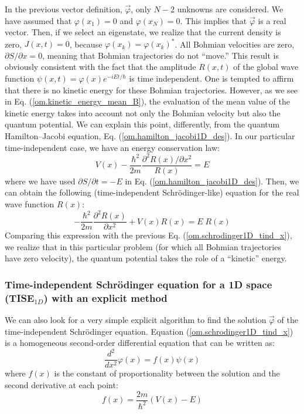 \documentclass[nofootinbib, secnumarabic, amsmath, nobibnotes,11pt,aps,pra, floatfix]{revtex4-1}
\newcommand{\eref}[1]{Eq. (\ref{#1})}
\newcommand{\Eref}[1]{Equation (\ref{#1})}
\begin{document}
In the previous vector definition, $\vec \varphi$, only $N - 2$ unknowns are considered. We have assumed that $\varphi(x_1) = 0$ and $\varphi(x_N) = 0$. This implies that $\vec \varphi$ is a real vector. Then, if we select an eigenstate,  we realize that the current density is zero, $J(x,t) = 0$, because $\varphi(x_k) = \varphi(x_k)^*$. All Bohmian velocities are zero, $\partial S/\partial x = 0$, meaning that Bohmian trajectories do not ``move.'' This result is obviously consistent with the fact that the amplitude $R(x,t)$ of the global wave function $\psi(x,t) = \varphi(x) e^{-iE t/\hbar}$ is time independent. One is tempted to affirm that there is no kinetic energy for these Bohmian trajectories. However, as we see in \eref{om.kinetic_energy_mean_B}, the evaluation of the mean value of the kinetic energy takes into account not only the Bohmian velocity but also the quantum potential. We can explain this point, differently, from the quantum Hamilton--Jacobi equation, \eref{om.hamilton_jacobi1D_des}. In our particular time-independent case, we have an energy conservation law:
\begin{equation*}
V(x) - \frac{\hbar^2} {2 m} \frac{{\partial}^2 R(x)/ \partial x^2} {R(x)} = E
\end{equation*}
where we have used $\partial S/\partial t = -E$ in \eref{om.hamilton_jacobi1D_des}. Then, we can obtain the following (time-independent Schr\"odinger-like) equation for the real wave function $R(x)$:
\begin{equation}
\label{om.schrodinger1D_tind_x_for R}
-\frac{\hbar^2} {2 m} \frac{{\partial}^2 R(x)} {\partial x^2} + V(x) R(x) = E \; R(x)
\end{equation}
Comparing this expression with the previous
\eref{om.schrodinger1D_tind_x}, we realize that in this particular
problem (for which all Bohmian trajectories have zero velocity), the quantum
potential takes the role of a ``kinetic'' energy.

\subsubsection{Time-independent Schr\"odinger equation for a 1D space (TISE$_{1D}$) with an explicit method}

We can also look for a very simple explicit algorithm to find the solution $\vec \varphi$ of the time-independent Schr\"odinger equation. \Eref{om.schrodinger1D_tind_x} is a homogeneous second-order differential equation that can be written as:
\begin{equation}
\frac{{d}^{2}}{d{x}^{2}}\varphi(x) = f(x)\psi (x)
\label{om.numerov1}
\end{equation}
where $f(x)$ is the constant of proportionality between the solution and the second derivative at each point:
\begin{equation}
f(x) = \frac{ 2 m} {{\hbar }^{2}}(V(x) - {E})
\end{equation}
\end{document}
